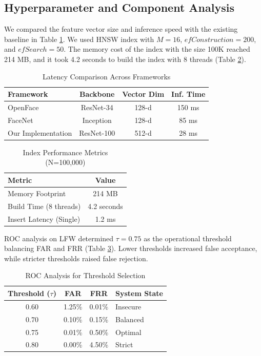 \documentclass[conference]{IEEEtran}
\begin{document}
\subsection{Hyperparameter and Component Analysis}
We compared the feature vector size and inference speed with the existing baseline in Table \ref{tab_compare}. We used HNSW index with $M = 16$, $efConstruction = 200$, and $efSearch = 50$. The memory cost of the index with the size 100K reached 214 MB, and it took 4.2 seconds to build the index with 8 threads (Table \ref{tab_index_metrics}).

\begin{table}[htbp]
\caption{Latency Comparison Across Frameworks}
\begin{center}
\begin{tabular}{|l|c|c|c|}
\hline
Framework & Backbone & Vector Dim & Inf. Time \\
\hline
OpenFace \cite{b17} & ResNet-34 & 128-d & 150 ms \\
\hline
FaceNet \cite{b18} & Inception & 128-d & 85 ms \\
\hline
Our Implementation & ResNet-100 & 512-d & 28 ms \\
\hline
\end{tabular}
\label{tab_compare}
\end{center}
\end{table}

\begin{table}[htbp]
\caption{Index Performance Metrics (N=100,000)}
\begin{center}
\begin{tabular}{|l|c|}
\hline
Metric & Value \\
\hline
Memory Footprint & 214 MB \\
\hline
Build Time (8 threads) & 4.2 seconds \\
\hline
Insert Latency (Single) & 1.2 ms \\
\hline
\end{tabular}
\end{center}
\label{tab_index_metrics}
\end{table}

ROC analysis on LFW determined $\tau = 0.75$ as the operational threshold balancing FAR and FRR (Table \ref{tab_roc}). Lower thresholds increased false acceptance, while stricter thresholds raised false rejection.

\begin{table}[htbp]
\caption{ROC Analysis for Threshold Selection}
\begin{center}
\begin{tabular}{|c|c|c|l|}
\hline
Threshold ($\tau$) & FAR & FRR & System State \\
\hline
0.60 & 1.25\% & 0.01\% & Insecure \\
\hline
0.70 & 0.10\% & 0.15\% & Balanced \\
\hline
0.75 & 0.01\% & 0.50\% & Optimal \\
\hline
0.80 & 0.00\% & 4.50\% & Strict \\
\hline
\end{tabular}
\label{tab_roc}
\end{center}
\end{table}
\end{document}
